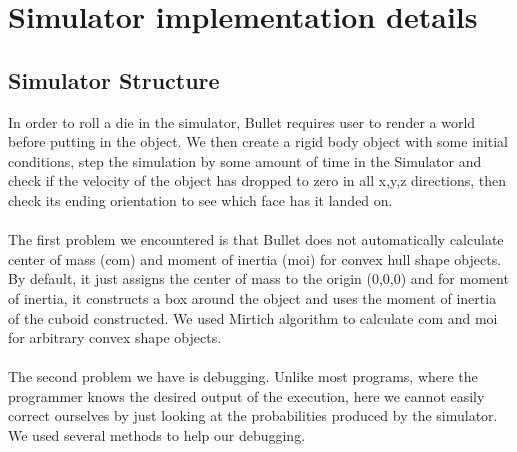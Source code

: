 \section{Simulator implementation details}

\subsection{Simulator Structure}
In order to roll a die in the simulator, Bullet requires user to render a world before putting in the object. We then create a rigid body object with some initial conditions, step the simulation by some amount of time in the Simulator and check if the velocity of the object has dropped to zero in all x,y,z directions, then check its ending orientation to see which face has it landed on.\\\\
The first problem we encountered is that Bullet does not automatically calculate center of mass (com) and moment of inertia (moi) for convex hull shape objects. By default, it just assigns the center of mass to the origin (0,0,0) and for moment of inertia, it constructs a box around the object and uses the moment of inertia of the cuboid constructed. We used Mirtich algorithm\cite{Mirtich:1996:FAC:643318.643322} to calculate com and moi for arbitrary convex shape objects.\\\\
The second problem we have is debugging. Unlike most programs, where the programmer knows the desired output of the execution, here we cannot easily correct ourselves by just looking at the probabilities produced by the simulator. We used several methods to help our debugging.\\
